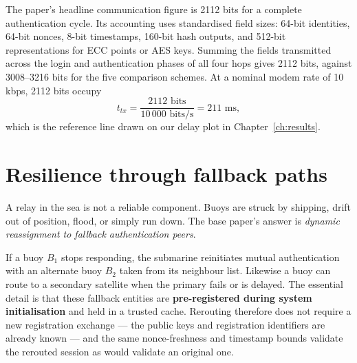 The paper's headline communication figure is 2112 bits for a complete authentication cycle.
Its accounting uses standardised field sizes: 64-bit identities, 64-bit nonces, 8-bit
timestamps, 160-bit hash outputs, and 512-bit representations for ECC points or AES keys.
Summing the fields transmitted across the login and authentication phases of all four hops
gives 2112 bits, against 3008--3216 bits for the five comparison schemes. At a nominal
modem rate of 10\,kbps, 2112 bits occupy
\begin{equation}
t_{tx} = \frac{2112 \text{ bits}}{10\,000 \text{ bits/s}} = 211\text{ ms},
\end{equation}
which is the reference line drawn on our delay plot in Chapter~\ref{ch:results}.

\section{Resilience through fallback paths}
\label{sec:fallback}

A relay in the sea is not a reliable component. Buoys are struck by shipping, drift out of
position, flood, or simply run down. The base paper's answer is \emph{dynamic reassignment
to fallback authentication peers}.

If a buoy $B_1$ stops responding, the submarine reinitiates mutual authentication with an
alternate buoy $B_2$ taken from its neighbour list. Likewise a buoy can route to a secondary
satellite when the primary fails or is delayed. The essential detail is that these fallback
entities are \textbf{pre-registered during system initialisation} and held in a trusted
cache. Rerouting therefore does not require a new registration exchange --- the public keys
and registration identifiers are already known --- and the same nonce-freshness and
timestamp bounds validate the rerouted session as would validate an original one.

